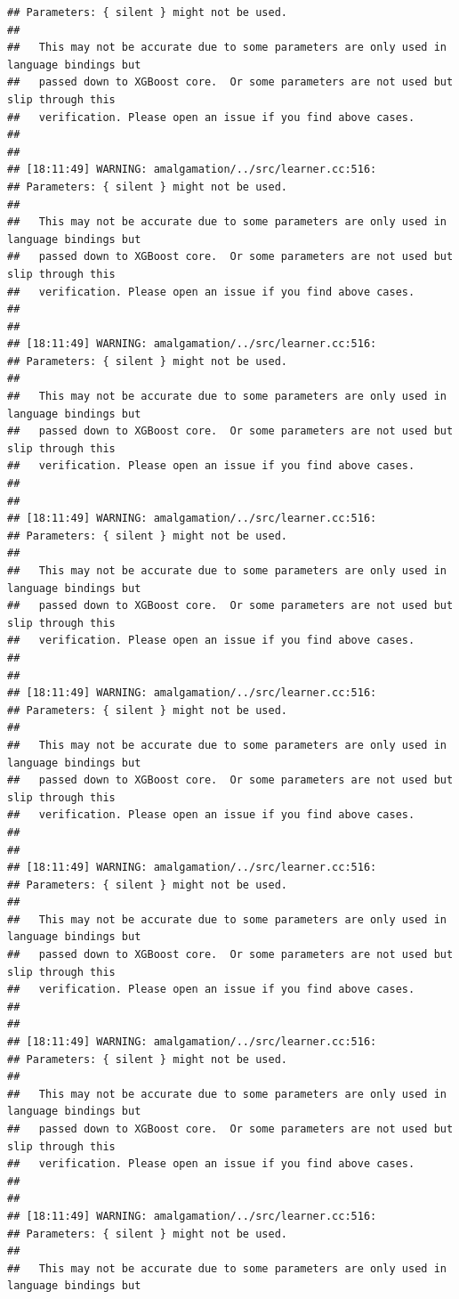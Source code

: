 \documentclass[AMS,STIX2COL]{WileyNJD-v2}\usepackage[]{graphicx}\usepackage[]{color}
\makeatletter
\newenvironment{kframe}{%
 \def\at@end@of@kframe{}%
 \ifinner\ifhmode%
  \def\at@end@of@kframe{\end{minipage}}%
  \begin{minipage}{\columnwidth}%
 \fi\fi%
 \def\FrameCommand##1{\hskip\@totalleftmargin \hskip-\fboxsep
 \colorbox{shadecolor}{##1}\hskip-\fboxsep
     \hskip-\linewidth \hskip-\@totalleftmargin \hskip\columnwidth}%
 \MakeFramed {\advance\hsize-\width
   \@totalleftmargin\z@ \linewidth\hsize
   \@setminipage}}%
 {\par\unskip\endMakeFramed%
 \at@end@of@kframe}
\newenvironment{knitrout}{}{} %
\makeatother
\begin{document}
\begin{knitrout}
\begin{kframe}
\begin{verbatim}
## Parameters: { silent } might not be used.
## 
##   This may not be accurate due to some parameters are only used in language bindings but
##   passed down to XGBoost core.  Or some parameters are not used but slip through this
##   verification. Please open an issue if you find above cases.
## 
## 
## [18:11:49] WARNING: amalgamation/../src/learner.cc:516: 
## Parameters: { silent } might not be used.
## 
##   This may not be accurate due to some parameters are only used in language bindings but
##   passed down to XGBoost core.  Or some parameters are not used but slip through this
##   verification. Please open an issue if you find above cases.
## 
## 
## [18:11:49] WARNING: amalgamation/../src/learner.cc:516: 
## Parameters: { silent } might not be used.
## 
##   This may not be accurate due to some parameters are only used in language bindings but
##   passed down to XGBoost core.  Or some parameters are not used but slip through this
##   verification. Please open an issue if you find above cases.
## 
## 
## [18:11:49] WARNING: amalgamation/../src/learner.cc:516: 
## Parameters: { silent } might not be used.
## 
##   This may not be accurate due to some parameters are only used in language bindings but
##   passed down to XGBoost core.  Or some parameters are not used but slip through this
##   verification. Please open an issue if you find above cases.
## 
## 
## [18:11:49] WARNING: amalgamation/../src/learner.cc:516: 
## Parameters: { silent } might not be used.
## 
##   This may not be accurate due to some parameters are only used in language bindings but
##   passed down to XGBoost core.  Or some parameters are not used but slip through this
##   verification. Please open an issue if you find above cases.
## 
## 
## [18:11:49] WARNING: amalgamation/../src/learner.cc:516: 
## Parameters: { silent } might not be used.
## 
##   This may not be accurate due to some parameters are only used in language bindings but
##   passed down to XGBoost core.  Or some parameters are not used but slip through this
##   verification. Please open an issue if you find above cases.
## 
## 
## [18:11:49] WARNING: amalgamation/../src/learner.cc:516: 
## Parameters: { silent } might not be used.
## 
##   This may not be accurate due to some parameters are only used in language bindings but
##   passed down to XGBoost core.  Or some parameters are not used but slip through this
##   verification. Please open an issue if you find above cases.
## 
## 
## [18:11:49] WARNING: amalgamation/../src/learner.cc:516: 
## Parameters: { silent } might not be used.
## 
##   This may not be accurate due to some parameters are only used in language bindings but

\end{verbatim}
\end{kframe}
\end{knitrout}
\end{document}
